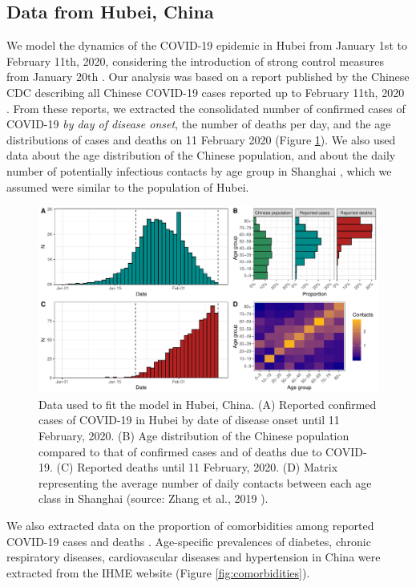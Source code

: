 \documentclass{article}
\begin{document}
\subsection{Data from Hubei, China}
We model the dynamics of the COVID-19 epidemic in Hubei from January 1st to February 11th, 2020, considering the introduction of strong control measures from January 20th \cite{jointmission}. 
Our analysis was based on a report published by the Chinese CDC describing all Chinese COVID-19 cases reported up to February 11th, 2020 \cite{Team2020}.
From these reports, we extracted the consolidated number of confirmed cases of COVID-19 {\em by day of disease onset}, the number of deaths per day, and the age distributions of cases and deaths on 11 February 2020 (Figure \ref{fig:china_case_incidence.pdf}).
We also used data about the age distribution of the Chinese population, and about the daily number of potentially infectious contacts by age group in Shanghai \cite{zhang2019patterns}, which we assumed were similar to the population of Hubei.

\begin{figure}[h]
		\centering
		\includegraphics[width=15cm]{../format_output/figures/data_china2.pdf}
		\caption{Data used to fit the model in Hubei, China. (A) Reported confirmed cases of COVID-19 in Hubei by date of disease onset until 11 February, 2020. (B) Age distribution of the Chinese population compared to that of confirmed cases and of deaths due to COVID-19. (C) Reported deaths until 11 February, 2020. (D) Matrix representing the average number of daily contacts between each age class in Shanghai (source: Zhang et al., 2019 \cite{zhang2019patterns}).}
		\label{fig:china_case_incidence.pdf}
\end{figure}

We also extracted data on the proportion of comorbidities among reported COVID-19 cases and deaths \cite{Team2020}.
Age-specific prevalences of diabetes, chronic respiratory diseases, cardiovascular diseases and hypertension in China were extracted from the IHME website \cite{ihme} (Figure \ref{fig:comorbidities}).
\end{document}
